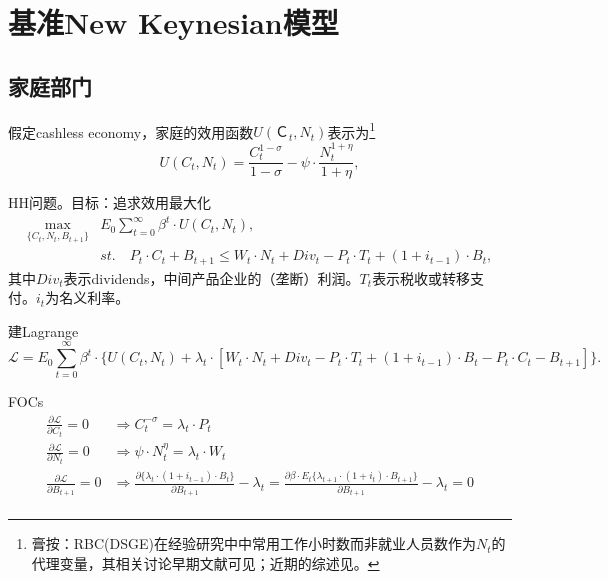 \chapter{基准New Keynesian模型}
\label{sec:Basic-NK-model}

\section{家庭部门}
\label{sec:Basic-NK-model-HH-sector}


假定cashless economy，家庭的效用函数$U(Ｃ_t, N_t)$表示为\footnote{膏按：RBC(DSGE)在经验研究中中常用工作小时数而非就业人员数作为$N_t$的代理变量，其相关讨论早期文献可见\cite{Hansen:1985ku,Rogerson:1988js}；近期的综述见\cite{Rogerson:2009ez}。}
\begin{equation}
  \label{eq:utility-function}
  U(C_t, N_t) = \frac{C_t^{1-\sigma}}{1-\sigma} - \psi \cdot \frac{N_t^{1+\eta}}{1+\eta},
\end{equation}

HH问题。目标：追求效用最大化
\begin{align}
  \label{eq:HH-problem-max}
  \max_{\{C_t, N_t, B_{t+1}\}} & E_0 \sum_{t=0}^{\infty} \beta^t \cdot U(C_t, N_t), \nonumber \\
&st. \quad P_t \cdot C_t + B_{t+1} \le W_t \cdot N_t + Div_t - P_t \cdot T_t + (1+i_{t-1}) \cdot B_t,
\end{align}
其中$Div_t$表示dividends，中间产品企业的（垄断）利润。$T_t$表示税收或转移支付。$i_t$为名义利率。

建Lagrange
\begin{equation}
  \label{eq:HH-problem-lagrange}
  \mathcal{L} = E_0 \sum_{t=0}^{\infty} \beta^t \cdot \{ U(C_t, N_t) + \lambda_t \cdot \left[W_t \cdot N_t + Div_t - P_t \cdot T_t + (1+i_{t-1}) \cdot B_t - P_t \cdot C_t - B_{t+1}\right]\}.
\end{equation}

FOCs
\begin{align*}
  \frac{\partial \mathcal{L}}{\partial C_t}=0 &\Rightarrow C_t^{-\sigma} = \lambda_t \cdot P_t \\
  \frac{\partial \mathcal{L}}{\partial N_t}=0 & \Rightarrow \psi \cdot N_t^{\eta} = \lambda_t \cdot W_t \\
\frac{\partial \mathcal{L}}{\partial B_{t+1}}=0 & \Rightarrow \frac{\partial \{\lambda_t \cdot (1 + i_{t-1}) \cdot B_t\}}{\partial B_{t+1}} - \lambda_t = \frac{\partial \beta \cdot E_t \{ \lambda_{t+1} \cdot (1 + i_{t}) \cdot B_{t+1} \} } {\partial B_{t+1}} - \lambda_t = 0\\
\end{align*}

